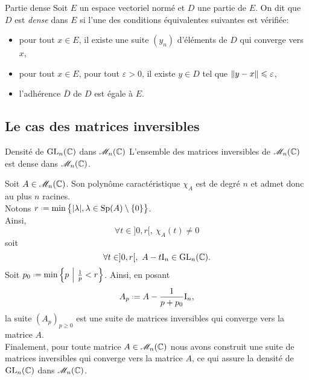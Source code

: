 \begin{defi}{Partie dense}
    Soit $E$ un espace vectoriel normé et $D$ une partie de $E$. On dit que $D$ est \emph{dense} dans $E$ si l'une des conditions équivalentes suivantes est vérifiée:
    \begin{itemize}
        \item pour tout $x \in E$, il existe une suite $(y_n)$ d'éléments de $D$ qui converge vers $x$,
        \item pour tout $x \in E$, pour tout $\varepsilon > 0$, il existe $y \in D$ tel que $\Vert y - x \Vert \leqslant \varepsilon$,
        \item l'adhérence $\overline{D}$ de $D$ est égale à $E$.
    \end{itemize}
\end{defi}

\subsection{Le cas des matrices inversibles}

\begin{theo}{Densité de $\mathrm{GL}_n(\mathbb{C})$ dans $\mathscr{M}_n(\mathbb{C})$}
    L'ensemble des matrices inversibles de $\mathscr{M}_n(\mathbb{C})$ est dense dans $\mathscr{M}_n(\mathbb{C})$.
\end{theo}

\begin{preuve}
    Soit $A \in \mathscr{M}_n(\mathbb{C})$. Son polynôme caractéristique $\chi_A$ est de degré $n$ et admet donc au plus $n$ racines. \\
    Notons $r \defeq \min \big\{ |\lambda|, \lambda \in \Sp(A) \setminus \{0\} \big\}$. \\
    Ainsi,
    $$\forall t \in ]0,r[,\ \chi_A(t) \not= 0$$ 
    soit 
    $$\forall t \in ]0,r[,\ A - t \mathrm{I}_n\in \mathrm{GL}_n(\mathbb{C}).$$
    Soit $p_0 \defeq \min \left\{ p\ \middle|\ \frac{1}{p} < r \right\}$. Ainsi, en posant
    $$A_p \defeq A - \frac{1}{p + p_0} \I_n,$$
    la suite $(A_p)_{p \geqslant 0}$ est une suite de matrices inversibles qui converge vers la matrice $A$. \\
    Finalement, pour toute matrice $A \in \mathscr{M}_n(\mathbb{C})$ nous avons construit une suite de matrices inversibles qui converge vers la matrice $A$, ce qui assure la densité de $\mathrm{GL}_n(\mathbb{C})$ dans $\mathscr{M}_n(\mathbb{C})$.
\end{preuve}

\begin{marginfigure}[-8cm]
    \centering
    
\end{marginfigure}

